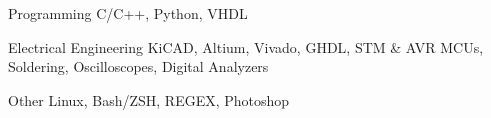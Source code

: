 


\begin{cvskills}


    \cvskill
    {Programming} %
    {C/C++, Python, VHDL} %


    \cvskill
    {Electrical Engineering} %
    {KiCAD, Altium, Vivado, GHDL, STM \& AVR MCUs, Soldering, Oscilloscopes, Digital Analyzers} %


    \cvskill
    {Other} %
    {Linux, Bash/ZSH, REGEX, Photoshop} %


\end{cvskills}